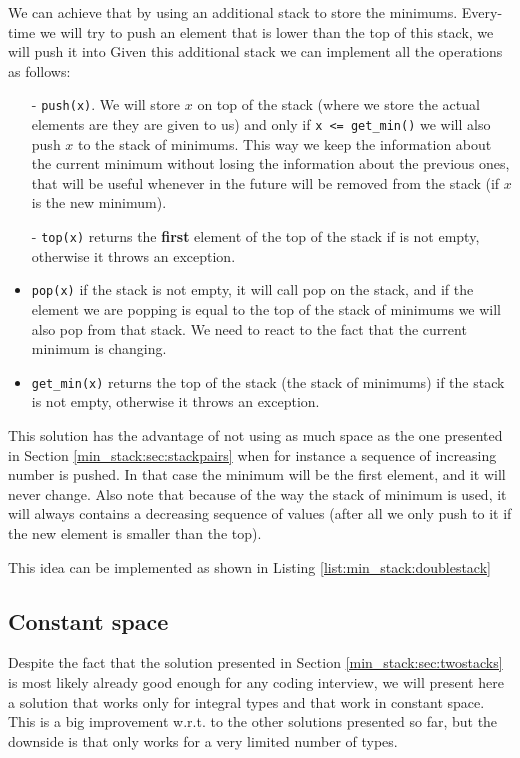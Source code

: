 We can achieve that by using an additional stack to store the minimums. Every-time we will try to push an element that is lower than the top of this stack, we will push it into  Given this additional stack we can implement all the operations as follows:
\begin{itemize}
	\item[-]\lstinline[columns=fixed]{push(x)}. We will store $x$ on top of the  stack (where we store the actual elements are they are given to us)  and only if  \lstinline[columns=fixed]{x <= get_min()} we will also push $x$ to the stack of minimums. This way we keep the information about the current minimum without losing the information about the previous ones, that will be useful whenever in the future will be removed from the stack (if $x$ is the new minimum).
	\item[-]\lstinline[columns=fixed]{top(x)}  returns the \textbf{first} element of the top of the  stack if is not empty, otherwise it throws an exception.
	\item[-]\lstinline[columns=fixed]{pop(x)} if the stack is not empty, it will call pop on the  stack, and if the element we are popping is equal to the top of the stack of minimums we will also pop from that stack. We need to react to the fact that the current minimum is changing.
	\item[-]\lstinline[columns=fixed]{get_min(x)}  returns the top of the  stack (the stack of minimums) if the stack is not empty, otherwise it throws an exception.
\end{itemize}
This solution has the advantage of not using as much space as the one presented in Section \ref{min_stack:sec:stackpairs} when for instance a sequence of  increasing number is pushed. In that case the minimum will be the first element, and it will never change. Also note that because of the way the stack of minimum is used, it will always contains a decreasing sequence of values (after all we only push to it if the new element is smaller than the top).

This idea can be implemented as shown in Listing \ref{list:min_stack:doublestack}

 

\subsection{Constant space}
\label{min_stack:sec:constantspace}
Despite the fact that the solution presented in Section \ref{min_stack:sec:twostacks} is most likely already good enough for any coding interview, we will present here a solution that works only for integral types and that work in constant space. This is a big improvement w.r.t. to the other solutions presented so far, but the downside is that only works for a very limited number of types.

